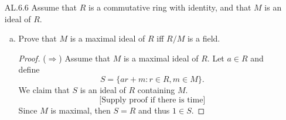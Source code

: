 \documentclass[12pt]{article}
\begin{document}
\begin{enumerate}
\begin{enumerate}[(a)]
\begin{enumerate}[i.]
\begin{proof}
                                \begin{align*}
                                    9\cdot1\cdot5\to&(1, 0, 5), (1, 0, 10), (1,
                                    0, 15), (1, 0, 20), \\
                                    &(2, 0, 5), (2, 0, 10), (2, 0, 15), (2, 0,
                                    20), \\
                                    &(4, 0, 5), (4, 0, 10), (4, 0, 15), (4, 0,
                                    20), \\
                                    &(5, 0, 5), (5, 0, 10), (5, 0, 15), (5, 0,
                                    20), \\
                                    &(7, 0, 5), (7, 0, 10), (7, 0, 15), (7, 0,
                                    20), \\
                                    &(8, 0, 5), (8, 0, 10), (8, 0, 15), (8, 0,
                                    20).\\
                                \end{align*}
                                There are 24 elements of order 45. 
                            \end{proof}
                    \end{enumerate}
            \end{enumerate}
        \item[AL.6.6] Assume that $R$ is a commutative ring with identity, and
            that $M$ is an ideal of $R$.
            \begin{enumerate}[(a)]
                \item Prove that $M$ is a maximal ideal of $R$ iff $R/M$ is
                    a field. 
                    \begin{proof}
                        ($\Rightarrow$) Assume that $M$ is a maximal ideal of
                        $R$. Let $a\in R$ and define 
                        \begin{equation*}
                            S=\{ar+m:r\in R, m\in M\}.
                        \end{equation*}
                        We claim that $S$ is an ideal of $R$ containing $M$.
                        \begin{equation*}
                            \text{[Supply proof if there is time]}
                        \end{equation*}
                        Since $M$ is maximal, then $S=R$ and thus $1\in S$.

\end{proof}
\end{enumerate}
\end{enumerate}
\end{document}
